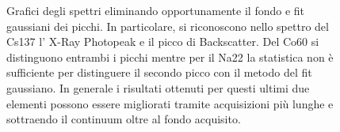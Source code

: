 \documentclass[a4paper]{article}
\begin{document}
\begin{figure}[H]
    \qquad
    \qquad
    \qquad
    \qquad
    \qquad
   \caption{Grafici degli spettri eliminando opportunamente il fondo e fit gaussiani dei picchi. In particolare, si riconoscono nello spettro del Cs137 l' X-Ray Photopeak e il picco di Backscatter. Del Co60 si distinguono entrambi i picchi mentre per il Na22 la statistica non è sufficiente per distinguere il secondo picco con il metodo del fit gaussiano. In generale i risultati ottenuti per questi ultimi due elementi possono essere migliorati tramite acquisizioni più lunghe e sottraendo il continuum oltre al fondo acquisito.}%
    \label{fig:1}%
\end{figure}
\end{document}

